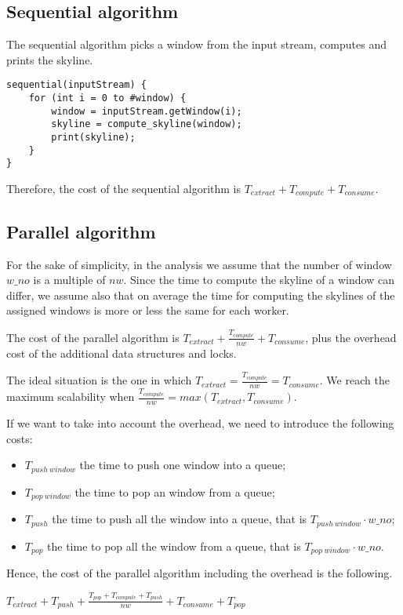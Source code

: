 \subsection{Sequential algorithm}
The sequential algorithm picks a window from the input stream, computes and prints the skyline.

\begin{verbatim}
sequential(inputStream) {
    for (int i = 0 to #window) {
        window = inputStream.getWindow(i);
        skyline = compute_skyline(window);
        print(skyline);
    }
}
\end{verbatim}

\noindent
Therefore, the cost of the sequential algorithm is $T_{extract} +  T_{compute} + T_{consume}$.


\subsection{Parallel algorithm}
For the sake of simplicity, in the analysis we assume that the number of window $w\_no$ is a multiple of $nw$. Since the time to compute the skyline of a window can differ, we assume also that on average the time for computing the skylines of the assigned windows is more or less the same for each worker.

\bigskip\noindent
The cost of the parallel algorithm is $T_{extract} +  \frac{T_{compute}}{nw} + T_{consume}$, plus the overhead cost of the additional data structures and locks.

\bigskip\noindent
The ideal situation is the one in which $T_{extract} = \frac{T_{compute}}{nw} = T_{consume}$.
We reach the maximum scalability when $\frac{T_{compute}}{nw} = max(T_{extract}, T_{consume})$.

\bigskip\noindent
If we want to take into account the overhead, we need to introduce the following costs:
\begin{itemize}
    \item $T_{push\ window}$ the time to push one window into a queue;
    \item $T_{pop\ window}$ the time to pop an window from a queue;
    \item $T_{push}$ the time to push all the window into a queue, that is $T_{push\ window} \cdot w\_no$;
    \item $T_{pop}$ the time to pop all the window from a queue, that is $T_{pop\ window} \cdot w\_no$.
\end{itemize}

\noindent
Hence, the cost of the parallel algorithm including the overhead is the following.
\begin{center}
    $T_{extract} + T_{push} +
    \frac{T_{pop} + T_{compute} + T_{push}}{nw} +
    T_{consume} + T_{pop}$
\end{center}

